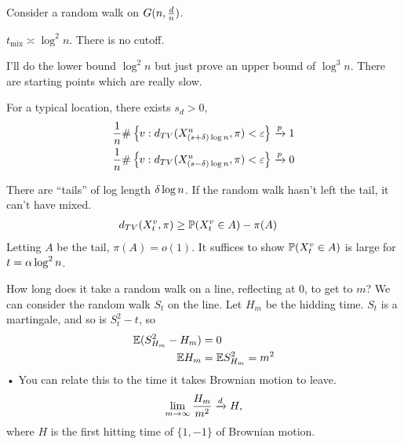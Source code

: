 Consider a random walk on $G(n,\frac{d}{n})$.

\begin{thm}
$t_{\text{mix}} \asymp \log^2n$. There is no cutoff.
\end{thm}
I'll do the lower bound $\log^2n$ but just prove an upper bound of $\log^3 n$. There are starting points which are really slow.

\begin{thm}[BLPS17]
For a typical location, there exists $s_d>0$,  %
\begin{align}
\frac{1}{n} \#\left\{{v}:{d_{TV}(X_{(s+\delta)\log n}^u, \pi)<\varepsilon}\right\} &\xrightarrow{p} 1\\
\frac{1}{n} \#\left\{{v}:{d_{TV}(X_{(s-\delta)\log n}^u, \pi)<\varepsilon}\right\} &\xrightarrow{p} 0
\end{align}
\end{thm}

There are ``tails'' of log length $\delta \log n$.
If the random walk hasn't left the tail, it can't have mixed. 
\begin{align}
d_{TV}(X_t^v, \pi) &\ge \mathbb{P}(X_t^v\in A)-\pi(A)
\end{align}
Letting $A$ be the tail, $\pi(A)=o(1)$. It suffices to show $\mathbb{P}(X_t^v\in A)$ is large for $t=\alpha \log^2n$. %

How long does it take a random walk on a line, reflecting at 0, to get to $m$?  We can consider the random walk $S_t$ on the line.
Let $H_m$ be the hidding time.  $S_t$ is a martingale, and so is $S_t^2-t$, so 
\begin{align}
\mathbb{E}(S_{H_m}^2-H_m)&=0\\
\mathbb{E} H_m &=\mathbb{E} S_{H_m}^2 = m^2
\end{align}•
You can relate this to the time it takes Brownian motion to leave.
\begin{align}
\lim_{m\to \infty} \frac{H_m}{m^2}\xrightarrow{d} H,
\end{align}
where $H$ is the first hitting time of $\{1,-1\}$ of Brownian motion.

